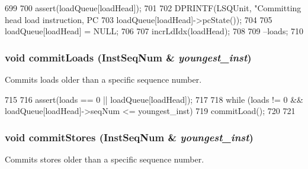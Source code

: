 \begin{DoxyCode}
699 {
700     assert(loadQueue[loadHead]);
701 
702     DPRINTF(LSQUnit, "Committing head load instruction, PC %
703             loadQueue[loadHead]->pcState());
704 
705     loadQueue[loadHead] = NULL;
706 
707     incrLdIdx(loadHead);
708 
709     --loads;
710 }
\end{DoxyCode}
\hypertarget{classLSQUnit_a1ae517a923a864a4e3a5aa1eeb2dd2d6}{
\subsubsection[{commitLoads}]{\setlength{\rightskip}{0pt plus 5cm}void commitLoads ({\bf InstSeqNum} \& {\em youngest\_\-inst})}}
\label{classLSQUnit_a1ae517a923a864a4e3a5aa1eeb2dd2d6}
Commits loads older than a specific sequence number. 


\begin{DoxyCode}
715 {
716     assert(loads == 0 || loadQueue[loadHead]);
717 
718     while (loads != 0 && loadQueue[loadHead]->seqNum <= youngest_inst) {
719         commitLoad();
720     }
721 }
\end{DoxyCode}
\hypertarget{classLSQUnit_a954ce1ce58b67cae49ba127d5ea40701}{
\subsubsection[{commitStores}]{\setlength{\rightskip}{0pt plus 5cm}void commitStores ({\bf InstSeqNum} \& {\em youngest\_\-inst})}}
\label{classLSQUnit_a954ce1ce58b67cae49ba127d5ea40701}
Commits stores older than a specific sequence number. 


